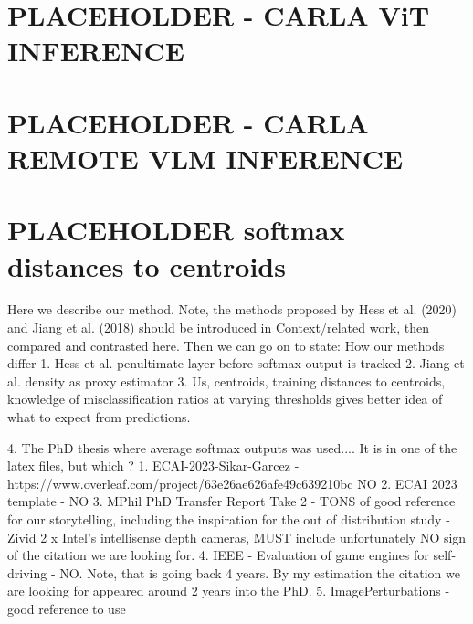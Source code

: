 \section{PLACEHOLDER - CARLA ViT INFERENCE}

\section{PLACEHOLDER - CARLA REMOTE VLM INFERENCE}

\section{PLACEHOLDER softmax distances to centroids}
Here we describe our method. Note, the methods proposed by 
Hess et al. (2020)  and Jiang et al. (2018) should be introduced in 
Context/related work, then compared and contrasted here.
Then we can go on to state:
How our methods differ
1. Hess et al. penultimate layer before softmax output is tracked
2. Jiang et al. density as proxy estimator
3. Us, centroids, training distances to centroids, knowledge of misclassification
ratios at varying thresholds gives better idea of what to expect from predictions.

4. The PhD thesis where average softmax outputs was used....
It is in one of the latex files, but which ?
1. ECAI-2023-Sikar-Garcez - https://www.overleaf.com/project/63e26ae626afe49c639210bc NO
2. ECAI 2023 template - NO
3. MPhil PhD Transfer Report Take 2 - TONS of good reference for our storytelling, including the
inspiration for the out of distribution study - Zivid 2 x Intel's intellisense depth cameras, MUST include
unfortunately NO sign of the citation we are looking for.
4. IEEE - Evaluation of game engines for self-driving - NO. Note, that is going back 4 years. By my estimation the citation we are looking for appeared around 2 years into the PhD.
5. ImagePerturbations - good reference to use



